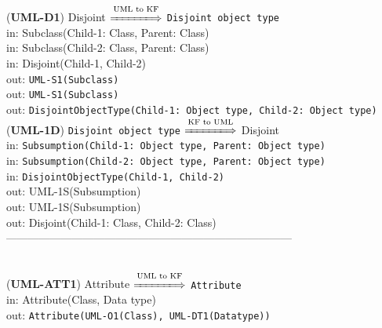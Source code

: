 \documentclass[sn-mathphys]{sn-jnl}
\begin{document}
{{({\bf UML-D1}) {Disjoint} $\overset{\text{UML to KF}}{\xLongrightarrow{\hspace*{1.4cm}}}$ {\tt Disjoint object type}\\
\hspace*{0.3cm}in: {Subclass(Child-1: Class, Parent: Class)} \\
\hspace*{0.3cm}in: {Subclass(Child-2: Class, Parent: Class)} \\
\hspace*{0.3cm}in: {Disjoint(Child-1, Child-2)} \\
\hspace*{0.5cm}out:  {\tt UML-S1(Subclass)}\\
\hspace*{0.5cm}out:  {\tt UML-S1(Subclass)}\\
\hspace*{0.5cm}out:  {\tt DisjointObjectType(Child-1: Object type, Child-2: Object type)}\\

({\bf UML-1D}) {\tt Disjoint object type} $\overset{\text{KF to UML}}{\xLongrightarrow{\hspace*{1.4cm}}}$ {Disjoint}\\
\hspace*{0.3cm}in: {\tt Subsumption(Child-1: Object type, Parent: Object type)} \\
\hspace*{0.3cm}in: {\tt Subsumption(Child-2: Object type, Parent: Object type)} \\
\hspace*{0.3cm}in: {\tt DisjointObjectType(Child-1, Child-2)} \\
\hspace*{0.5cm}out:  {UML-1S(Subsumption)}\\
\hspace*{0.5cm}out:  {UML-1S(Subsumption)}\\
\hspace*{0.5cm}out:  {Disjoint(Child-1: Class, Child-2: Class)}\\

------------------------------------------------------------------------------
\\ \

({\bf UML-ATT1}) {Attribute} $\overset{\text{UML to KF}}{\xLongrightarrow{\hspace*{1.4cm}}}$ {\tt Attribute}\\
\hspace*{0.3cm}in: Attribute(Class, Data type)\\
\hspace*{0.5cm}out: {\tt Attribute(UML-O1(Class), UML-DT1(Datatype))}\\

}}
\end{document}
